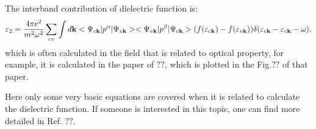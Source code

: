 \documentclass[a4paper, 12pt, titlepage,oneside,drop]{kthesis}
\begin{document}
The interband contribution of dielectric function is:
\begin{equation}\label{df2}
\varepsilon_2 = \frac{4 \pi e^2}{m^2\omega^2} \sum_{cv} \int d \textbf {k} <\Psi_{c{\textbf k}}|p^\alpha|\Psi_{v{\textbf k}}><\Psi_{v{\textbf k}}|p^\beta|\Psi_{c{\textbf k}}> (f(\varepsilon_{c \textbf k})-f(\varepsilon_{v \textbf k}))\delta(\varepsilon_{c {\textbf k}}-\varepsilon_{c{\textbf k}}-\omega),
\end{equation}
which is often calculated in the field that is related to optical property, for example, it is calculated in the paper of $??$, which is plotted in the Fig.$??$ of
that paper.

Here only some very basic equations are covered when it is related to calculate the dielectric function. If someone is interested in this topic, one can find more detailed in Ref. $??$.
\end{document}
